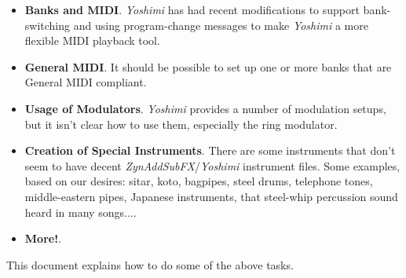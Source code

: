 \documentclass[
 11pt,
 twoside,
 a4paper,
 headinclude,
 footinclude,
 final                                 %
]{article}
\begin{document}
   \begin{itemize}
      \item \textbf{Banks and MIDI}.
         \textsl{Yoshimi} has had recent modifications to support
         bank-switching and using program-change messages to make
         \textsl{Yoshimi} a more flexible MIDI playback tool.
      \item \textbf{General MIDI}.
         It should be possible to set up one or more banks that
         are General MIDI compliant.
      \item \textbf{Usage of Modulators}.
         \textsl{Yoshimi} provides a number of modulation setups,
         but it isn't clear how to use them, especially the ring modulator.
      \item \textbf{Creation of Special Instruments}.
         There are some instruments that don't seem to have
         decent \textsl{ZynAddSubFX}/\textsl{Yoshimi} instrument files.
         Some examples, based on our desires: sitar, koto, bagpipes, steel
         drums, telephone tones, middle-eastern pipes, Japanese instruments,
         that steel-whip percussion sound heard in many songs....
      \item \textbf{More!}.
   \end{itemize}

   This document explains how to do some of the above tasks.


\rhead{\rightmark}         %
















\end{document}
